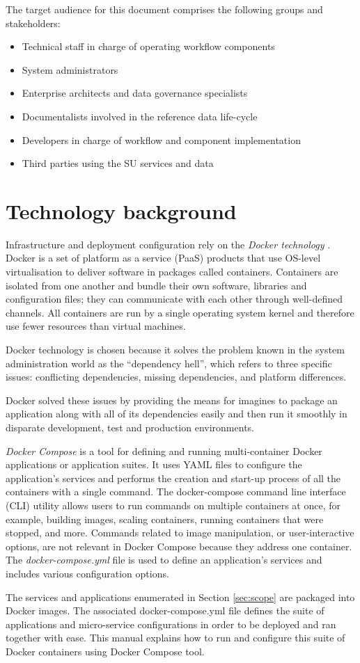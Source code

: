 	The target audience for this document comprises the following groups and stakeholders:	
	\begin{itemize}
		\item Technical staff in charge of operating workflow components
		\item System administrators
		\item Enterprise architects and data governance specialists
		\item Documentalists involved in the reference data life-cycle
		\item Developers in charge of workflow and component implementation
		\item Third parties using the SU services and data 
	\end{itemize}	
		
\section{Technology background}
\label{sec:background}

	Infrastructure and deployment configuration rely on the \textit{Docker technology} \citep{docker-merkel2014docker, docker}. Docker is a set of platform as a service (PaaS) products that use OS-level virtualisation to deliver software in packages called containers. Containers are isolated from one another and bundle their own software, libraries and configuration files; they can communicate with each other through well-defined channels. All containers are run by a single operating system kernel and therefore use fewer resources than virtual machines.

	Docker technology is chosen because it solves the problem known in the system administration world as the ``dependency hell'', which refers to three specific issues: conflicting dependencies, missing dependencies, and platform differences.

	Docker solved these issues by providing the means for imagines to package an application along with all of its dependencies easily and then run it smoothly in disparate development, test and production
environments.
		
	\textit{Docker Compose} is a tool for defining and running multi-container Docker applications or application suites. It uses YAML files to configure the application's services and performs the creation and start-up process of all the containers with a single command. The docker-compose command line interface (CLI) utility allows users to run commands on multiple containers at once, for example, building images, scaling containers, running containers that were stopped, and more. Commands related to image manipulation, or user-interactive options, are not relevant in Docker Compose because they address one container. The \textit{docker-compose.yml} file is used to define an application's services and includes various configuration options.

	The services and applications enumerated in Section \ref{sec:scope} are packaged into Docker images. The associated docker-compose.yml file defines the suite of applications and micro-service configurations in order to be deployed and ran together with ease. This manual explains how to run and configure this suite of Docker containers using Docker Compose tool.